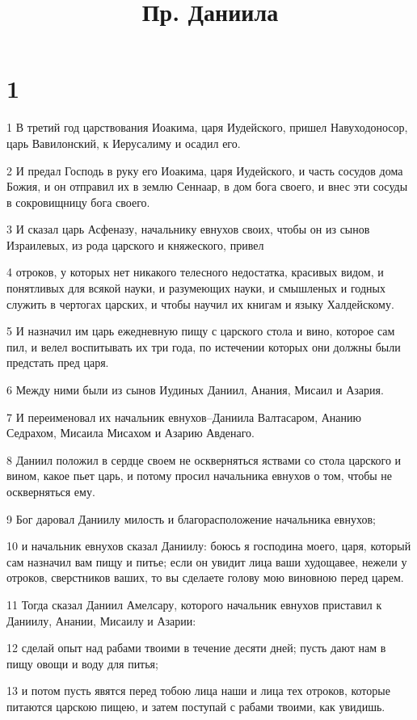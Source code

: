

\title{Пр. Даниила}


\chapter{1}

\par 1 В третий год царствования Иоакима, царя Иудейского, пришел Навуходоносор, царь Вавилонский, к Иерусалиму и осадил его.
\par 2 И предал Господь в руку его Иоакима, царя Иудейского, и часть сосудов дома Божия, и он отправил их в землю Сеннаар, в дом бога своего, и внес эти сосуды в сокровищницу бога своего.
\par 3 И сказал царь Асфеназу, начальнику евнухов своих, чтобы он из сынов Израилевых, из рода царского и княжеского, привел
\par 4 отроков, у которых нет никакого телесного недостатка, красивых видом, и понятливых для всякой науки, и разумеющих науки, и смышленых и годных служить в чертогах царских, и чтобы научил их книгам и языку Халдейскому.
\par 5 И назначил им царь ежедневную пищу с царского стола и вино, которое сам пил, и велел воспитывать их три года, по истечении которых они должны были предстать пред царя.
\par 6 Между ними были из сынов Иудиных Даниил, Анания, Мисаил и Азария.
\par 7 И переименовал их начальник евнухов--Даниила Валтасаром, Ананию Седрахом, Мисаила Мисахом и Азарию Авденаго.
\par 8 Даниил положил в сердце своем не оскверняться яствами со стола царского и вином, какое пьет царь, и потому просил начальника евнухов о том, чтобы не оскверняться ему.
\par 9 Бог даровал Даниилу милость и благорасположение начальника евнухов;
\par 10 и начальник евнухов сказал Даниилу: боюсь я господина моего, царя, который сам назначил вам пищу и питье; если он увидит лица ваши худощавее, нежели у отроков, сверстников ваших, то вы сделаете голову мою виновною перед царем.
\par 11 Тогда сказал Даниил Амелсару, которого начальник евнухов приставил к Даниилу, Анании, Мисаилу и Азарии:
\par 12 сделай опыт над рабами твоими в течение десяти дней; пусть дают нам в пищу овощи и воду для питья;
\par 13 и потом пусть явятся перед тобою лица наши и лица тех отроков, которые питаются царскою пищею, и затем поступай с рабами твоими, как увидишь.
